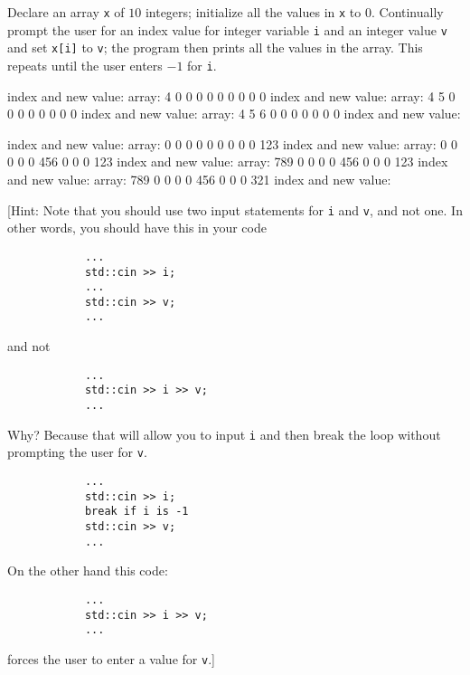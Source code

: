 Declare an array \verb!x! of $10$ integers; initialize all the values in
\verb!x! to $0$. Continually prompt the user for an index value for integer
variable \verb!i! and an integer value \verb!v! and set \verb!x[i]! to
\verb!v!; the program then prints all the values in the array. This repeats
until the user enters $-1$ for \verb!i!.

\resett
\nextt
\begin{console}[frame=single, commandchars=\\\{\}]
index and new value: 
array: 4 0 0 0 0 0 0 0 0 0
index and new value: 
array: 4 5 0 0 0 0 0 0 0 0
index and new value: 
array: 4 5 6 0 0 0 0 0 0 0
index and new value: 
\end{console}

\nextt
\begin{console}[frame=single, commandchars=\\\{\}]
index and new value: 
array: 0 0 0 0 0 0 0 0 0 123
index and new value: 
array: 0 0 0 0 0 456 0 0 0 123
index and new value: 
array: 789 0 0 0 0 456 0 0 0 123
index and new value: 
array: 789 0 0 0 0 456 0 0 0 321
index and new value: 
\end{console}

[Hint: Note that you should use two input statements for \verb!i! and \verb!v!,
and not one. In other words, you should have this in your code

\begin{Verbatim}
            ...
            std::cin >> i;
            ...
            std::cin >> v;
            ...
\end{Verbatim}

and not 

\begin{Verbatim}
            ...
            std::cin >> i >> v;
            ...
\end{Verbatim}

Why? Because that will allow you to input \verb!i! and then break the loop
without prompting the user for \verb!v!.

\begin{Verbatim}
            ...
            std::cin >> i;
            break if i is -1
            std::cin >> v;
            ...
\end{Verbatim}

On the other hand this code:

\begin{Verbatim}
            ...
            std::cin >> i >> v;
            ...
\end{Verbatim}

forces the user to enter a value for \verb!v!.]
